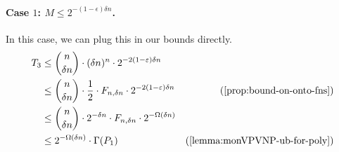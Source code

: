 \paragraph{Case $1$: $M \leq 2^{-(1-\epsilon) \delta n}$.} In this case, we can plug this in our bounds directly.
\begin{align*}
  T_3 & \leq \binom{n}{\delta n} \cdot (\delta n)^n\cdot 2^{-2(1-\epsilon)\delta n} \\
      & \leq \binom{n}{\delta n} \cdot \frac{1}{2} \cdot F_{n,\delta n} \cdot 2^{-2(1-\epsilon)\delta n} & \text{(\autoref{prop:bound-on-onto-fns})}\\
      & \leq \binom{n}{\delta n} \cdot 2^{-\delta n} \cdot F_{n,\delta n} \cdot 2^{-\Omega(\delta n)}\\
      & \leq 2^{-\Omega(\delta n)} \cdot \Gamma(P_1) & \text{(\autoref{lemma:monVPVNP-ub-for-poly})}
\end{align*}

